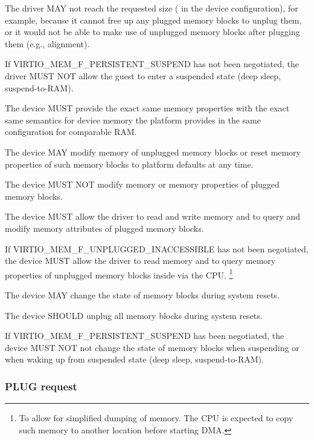 The driver MAY not reach the requested size ( in the
device configuration), for example, because it cannot free up any plugged
memory blocks to unplug them, or it would not be able to make use of
unplugged memory blocks after plugging them (e.g., alignment).

If VIRTIO_MEM_F_PERSISTENT_SUSPEND has not been negotiated, the driver MUST NOT
allow the guest to enter a suspended state (deep sleep, suspend-to-RAM).


The device MUST provide the exact same memory properties with the exact same
semantics for device memory the platform provides in the same configuration for
comparable RAM.

The device MAY modify memory of unplugged memory blocks or reset memory
properties of such memory blocks to platform defaults at any time.

The device MUST NOT modify memory or memory properties of plugged memory
blocks.

The device MUST allow the driver to read and write memory and to query
and modify memory attributes of plugged memory blocks.

If VIRTIO_MEM_F_UNPLUGGED_INACCESSIBLE has not been negotiated, the device
MUST allow the driver to read memory and to query memory properties of
unplugged memory blocks inside  via the CPU.
\footnote{To allow for simplified dumping of memory. The CPU is expected to
copy such memory to another location before starting DMA.}

The device MAY change the state of memory blocks during system resets.

The device SHOULD unplug all memory blocks during system resets.

If VIRTIO_MEM_F_PERSISTENT_SUSPEND has been negotiated, the device MUST NOT not
change the state of memory blocks when suspending or when waking up from
suspended state (deep sleep, suspend-to-RAM).

\subsubsection{PLUG request}\label{sec:Device Types / Memory Device / Device Operation / PLUG request}

